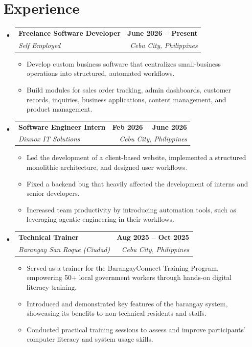 \documentclass[letterpaper,11pt]{article}
\makeatletter
\newcommand{\resumeItem}[1]{
  \item\small{
    {#1 \vspace{0pt}}
  }
}
\newcommand{\resumeSubheading}[4]{
  \vspace{-2pt}\item
    \begin{tabular*}{1.0\textwidth}[t]{l@{\extracolsep{\fill}}r}
      \textbf{#1} & \textbf{\small #2} \\
      \textit{\small#3} & \textit{\small #4} \\
    \end{tabular*}\vspace{-7pt}
}
\newcommand{\resumeSubHeadingListStart}{\begin{itemize}[leftmargin=0.0in, label={}]}
\newcommand{\resumeSubHeadingListEnd}{\end{itemize}}\vspace{0pt}
\newcommand{\resumeItemListStart}{\begin{itemize}}
\newcommand{\resumeItemListEnd}{\end{itemize}\vspace{-5pt}}
\makeatother
\begin{document}
\section{Experience}
    \resumeSubHeadingListStart
      \resumeSubheading{Freelance Software Developer}{June 2026 -- Present}{Self Employed}{Cebu City, Philippines}
        \resumeItemListStart
          \resumeItem{Develop custom business software that centralizes small-business operations into structured, automated workflows.}
          \resumeItem{Build modules for sales order tracking, admin dashboards, customer records, inquiries, business applications, content management, and product management.}
        \resumeItemListEnd
      \resumeSubheading{Software Engineer Intern}{Feb 2026 -- June 2026}{Dinnox IT Solutions}{Cebu City, Philippines} 
        \resumeItemListStart
          \resumeItem{Led the development of a client-based website, implemented a structured monolithic architecture, and designed user workflows.}
          \resumeItem{Fixed a backend bug that heavily affected the development of interns and senior developers.}
          \resumeItem{Increased team productivity by introducing automation tools, such as leveraging agentic engineering in their workflows.}
        \resumeItemListEnd
      \resumeSubheading{Technical Trainer}{Aug 2025 -- Oct 2025}{Barangay San Roque (Ciudad)}{Cebu City, Philippines} 
        \resumeItemListStart
          \resumeItem{Served as a trainer for the BarangayConnect Training Program, empowering 50+ local government workers through hands-on digital literacy training.}
          \resumeItem{Introduced and demonstrated key features of the barangay system, showcasing its benefits to non-technical residents and staffs.}
          \resumeItem{Conducted practical training sessions to assess and improve participants' computer literacy and system usage skills.}
        \resumeItemListEnd
    \resumeSubHeadingListEnd
    \vspace{-12pt}

\end{document}
